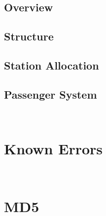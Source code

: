 \documentclass[12pt]{article}
\begin{document}
\subsection{Overview}
\subsection{Structure}
\subsection{Station Allocation}
\subsection{Passenger System}
\\[2\baselineskip]
\section{Known Errors}
\\[2\baselineskip]
\section{MD5}

\end{document}
